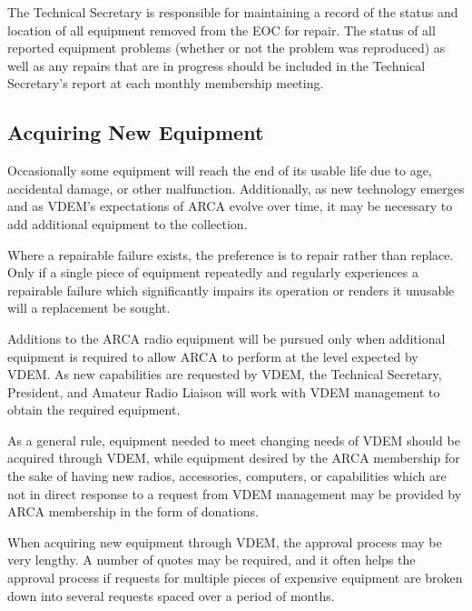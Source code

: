 \documentclass[pdflatex,letterpaper,twoside,12pt]{book}
\begin{document}
The Technical Secretary is responsible for maintaining a record of the status and location of all equipment removed from the EOC for repair.  The status of all reported equipment problems (whether or not the problem was reproduced) as well as any repairs that are in progress should be included in the Technical Secretary's report at each monthly membership meeting.

\subsection{Acquiring New Equipment}

Occasionally some equipment will reach the end of its usable life due to age, accidental damage, or other malfunction.  Additionally, as new technology emerges and as VDEM's expectations of ARCA evolve over time, it may be necessary to add additional equipment to the collection.

Where a repairable failure exists, the preference is to repair rather than replace.  Only if a single piece of equipment repeatedly and regularly experiences a repairable failure which significantly impairs its operation or renders it unusable will a replacement be sought.

Additions to the ARCA radio equipment will be pursued only when additional equipment is required to allow ARCA to perform at the level expected by VDEM.  As new capabilities are requested by VDEM, the Technical Secretary, President, and Amateur Radio Liaison will work with VDEM management to obtain the required equipment.

As a general rule, equipment needed to meet changing needs of VDEM should be acquired through VDEM, while equipment desired by the ARCA membership for the sake of having new radios, accessories, computers, or capabilities which are not in direct response to a request from VDEM management may be provided by ARCA membership in the form of donations.

When acquiring new equipment through VDEM, the approval process may be very lengthy.  A number of quotes may be required, and it often helps the approval process if requests for multiple pieces of expensive equipment are broken down into several requests spaced over a period of months.

\end{document}
